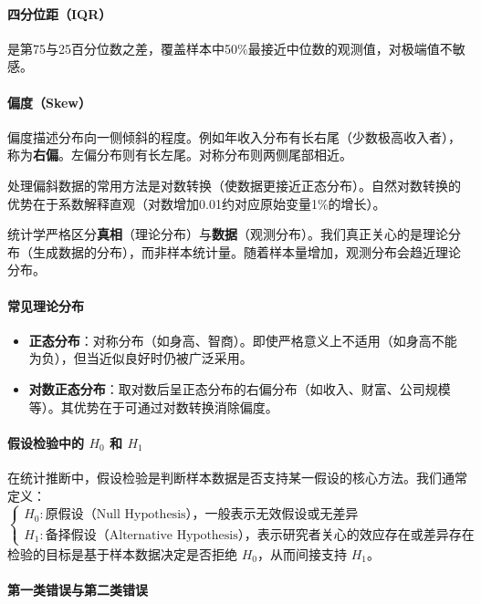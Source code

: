\paragraph*{四分位距（IQR）}是第75与25百分位数之差，覆盖样本中50\%最接近中位数的观测值，对极端值不敏感。

\paragraph*{偏度（Skew）}
偏度描述分布向一侧倾斜的程度。例如年收入分布有长右尾（少数极高收入者），称为\textbf{右偏}。左偏分布则有长左尾。对称分布则两侧尾部相近。

处理偏斜数据的常用方法是对数转换（使数据更接近正态分布）。自然对数转换的优势在于系数解释直观（对数增加0.01约对应原始变量1\%的增长）。

统计学严格区分\textbf{真相}（理论分布）与\textbf{数据}（观测分布）。我们真正关心的是理论分布（生成数据的分布），而非样本统计量。随着样本量增加，观测分布会趋近理论分布。

\paragraph*{常见理论分布}
\begin{itemize}
	\item \textbf{正态分布}：对称分布（如身高、智商）。即使严格意义上不适用（如身高不能为负），但当近似良好时仍被广泛采用。
	\item \textbf{对数正态分布}：取对数后呈正态分布的右偏分布（如收入、财富、公司规模等）。其优势在于可通过对数转换消除偏度。
\end{itemize}

\paragraph*{假设检验中的 \(H_0\) 和 \(H_1\)}

在统计推断中，假设检验是判断样本数据是否支持某一假设的核心方法。我们通常定义：
\[
\begin{cases}
H_0: \text{原假设（Null Hypothesis），一般表示无效假设或无差异}\\
H_1: \text{备择假设（Alternative Hypothesis），表示研究者关心的效应存在或差异存在}
\end{cases}
\]
检验的目标是基于样本数据决定是否拒绝 \(H_0\)，从而间接支持 \(H_1\)。

\paragraph*{第一类错误与第二类错误}

